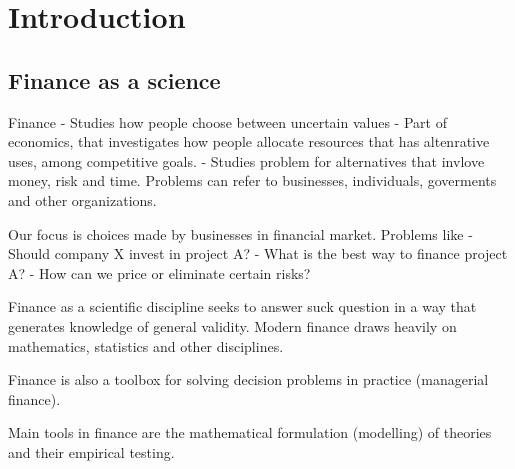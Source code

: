 \section{Introduction}
\subsection{Finance as a science}
Finance
- Studies how people choose between uncertain values
- Part of economics, that investigates how people allocate resources that has altenrative uses, among competitive goals.
- Studies problem for alternatives that invlove money, risk and time. Problems can refer to businesses, individuals, goverments and other organizations.

Our focus is choices made by businesses in financial market. Problems like
- Should company X invest in project A?
- What is the best way to finance project A?
- How can we price or eliminate certain risks?

Finance as a scientific discipline seeks to answer suck question in a way that generates knowledge of general validity. Modern finance draws heavily on mathematics, statistics and other disciplines. 

Finance is also a toolbox for solving decision problems in practice (managerial finance).

Main tools in finance are the mathematical formulation (modelling) of theories and their empirical testing.